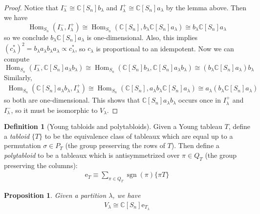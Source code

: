\documentclass[11pt]{article}
\newtheorem{prop}{Proposition}
\theoremstyle{definition}
\newtheorem{defn}{Definition}
\newcommand{\C}{\mathbb C}
\newcommand{\Hom}{\operatorname{Hom}}
\newcommand{\sgn}{\operatorname{sgn}}
\newcommand{\e}{\mathrm{e}}
\begin{document}
\begin{proof}
  Notice that $I^-_\lambda \cong \C[S_n]b_\lambda$ and $I^+_\lambda \cong
  \C[S_n]a_\lambda$ by the lemma above. 
  Then we have
  \begin{equation}
    \Hom_{S_n}(I^-_\lambda, I^+_\lambda) \cong \Hom_{S_n}(\C[S_n], b_\lambda \C[S_n] a_{\lambda}) \cong b_\lambda \C[S_n] a_{\lambda}
  \end{equation}
  so we conclude $b_{\lambda} \C[S_n]a_\lambda$ is one-dimensional. Also, this
  implies $(c_\lambda^*)^2 = b_{\lambda}a_\lambda b_{\lambda}a_{\lambda} \propto c_\lambda^*$, so 
  $c_{\lambda}$ is proportional to an idempotent.
  Now we can compute
  \begin{equation}
    \Hom_{S_n}(I^-_\lambda, \C[S_n]a_\lambda b_\lambda)  \cong \Hom_{S_n}(\C[S_n]b_\lambda, \C[S_n]a_\lambda b_{\lambda}) \cong (b_{\lambda} \C[S_n] a_\lambda) b_{\lambda}
  \end{equation}
  Similarly,
  \begin{align}
    \Hom_{S_n}(\C[S_n]a_\lambda b_{\lambda}, I^+_{\lambda}) \cong \Hom_{S_n}(\C[S_n], a_{\lambda}b_{\lambda} \C[S_n] a_{\lambda}) \cong a_{\lambda} (b_{\lambda} \C[S_n]a_\lambda)
  \end{align}
 so both are one-dimensional. This
 shows that $\C[S_n]a_{\lambda}b_{\lambda}$ occurs once in $I^+_\lambda$ and
 $I^-_\lambda$, so it must be isomorphic to $V_\lambda$.
\end{proof}

\begin{defn}[Young tabloids and polytabloids]
Given a Young tableau $T$, define a \textit{tabloid} $\{T\}$ to be the
equivalence class of tableaux which are equal up to a permutation $\sigma \in
P_T$ (the group preserving the rows of $T$). Then define a
\textit{polytabloid} to be a tableaux which is antisymmetrized over $\pi \in
Q_{T}$ (the group preserving the columns):
\begin{align}
\e_{T} \equiv \sum_{\pi \in Q_T}\sgn(\pi)\{ \pi T\}
\end{align}
\end{defn}

\begin{prop}
  Given a partition $\lambda$, we have
  \begin{align}
    V_\lambda \cong \C[S_n] \e_{T_\lambda}
  \end{align}
\end{prop}
\end{document}
